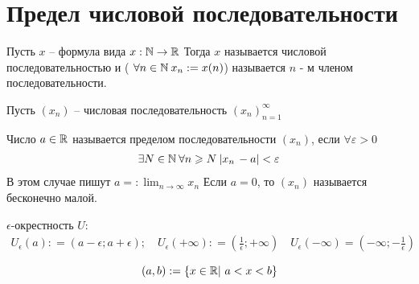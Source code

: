\section{Предел числовой последовательности}
\begin{definition}
    Пусть $ x $ -- формула вида $ x: \mathbb{N} \to \mathbb{R} $
    Тогда $ x $ называется числовой последовательностью и ( $ \forall n \in  \mathbb{N} \: x_n : = x(n) $) называется $ n $ - м членом последовательности.
\end{definition}
Пусть $ (x_n) $ -- числовая последовательность $ (x_n)_{n = 1}^\infty $
\begin{definition}
    Число $ a \in  \mathbb{R} $ называется пределом последовательности $ (x_n) $, если $ \forall \varepsilon > 0 $ \begin{gather}
        \exists N \in \mathbb{N} \: \forall n \geqslant N \: |x_n\, - a| < \varepsilon
    \end{gather}
    В этом случае пишут $ a = : \lim_{n \to \infty} x_n $
    Если $ a = 0 $, то $ (x_n) $ называется бесконечно малой.
\end{definition}
\begin{definition} $ \epsilon $-окрестность $ U $:
    \begin{gather}
        U_\epsilon(a): =(a - \epsilon; a + \epsilon); \quad U_\epsilon( + \infty): = \left(\frac{1}{\epsilon}; + \infty\right) \quad U_\epsilon( -\infty) = \left( - \infty; - \frac{1}{\epsilon}\right)
    \end{gather}
\end{definition}
\begin{note}
    \begin{equation}
        (a, b): = \{x \in \mathbb{R} | \ a < x < b\}
   \end{equation}
   
\end{note}
